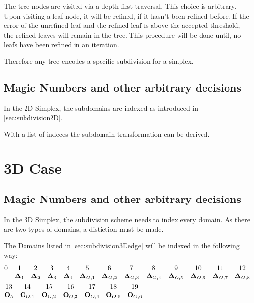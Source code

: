\documentclass{mitschrift}
\newcommand{\simplex}{\boldsymbol{\Delta}}
\begin{document}
The tree nodes are visited via a depth-first traversal. This choice is arbitrary.  Upon visiting a leaf node, it will be refined, if it hasn't been refined before.
If the error of the unrefined leaf and the refined leaf is above the accepted threshold, the refined leaves will remain in the tree.
This procedure will be done until, no leafs have been refined in an iteration.

Therefore any tree encodes a specific subdivision for a simplex.

\subsection{Magic Numbers and other arbitrary decisions}

In the 2D Simplex, the subdomains are indexed as introduced in \ref{sec:subdivision2D}.

With a list of indeces the subdomain transformation can be derived.

\section{3D Case}

\subsection{Magic Numbers and other arbitrary decisions}

In the 3D Simplex, the subdivision scheme needs to index every domain.
As there are two types of domains, a distiction must be made.

The Domains listed in \ref{sec:subdivision3Dedge} will be indexed in the following way: \begin{align*}
    &\begin{array}{@{}*{13}{c}@{}}
        0 & 1 & 2 & 3 & 4 & 5 & 6 & 7 & 8 & 9 & 10 & 11 & 12 \\
         & \simplex_1 & \simplex_2 & \simplex_3 & \simplex_4 
        & \simplex_{O,1} & \simplex_{O,2} & \simplex_{O,3} & \simplex_{O,4} & \simplex_{O,5} & \simplex_{O,6}
        & \simplex_{O,7} & \simplex_{O,8} \\
    \end{array} \\
    &\begin{array}{@{}*{7}{c}@{}}
        13 & 14 & 15 & 16 & 17 & 18 & 19 \\
        \mathbf{O}_5 & \mathbf{O}_{O,1} & \mathbf{O}_{O,2} & \mathbf{O}_{O,3} 
        & \mathbf{O}_{O,4} & \mathbf{O}_{O,5} & \mathbf{O}_{O,6}\\
    \end{array} 
\end{align*}

\pagebreak

\printbibliography
\end{document}
